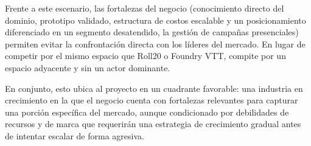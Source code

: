 Frente a este escenario, las fortalezas del negocio (conocimiento directo del dominio, prototipo validado, estructura de costos escalable y un posicionamiento diferenciado en un segmento desatendido, la gestión de campañas presenciales) permiten evitar la confrontación directa con los líderes del mercado. En lugar de competir por el mismo espacio que Roll20 o Foundry VTT, \nombreproyecto{} compite por un espacio adyacente y sin un actor dominante.

En conjunto, esto ubica al proyecto en un cuadrante favorable: una industria en crecimiento en la que el negocio cuenta con fortalezas relevantes para capturar una porción específica del mercado, aunque condicionado por debilidades de recursos y de marca que requerirán una estrategia de crecimiento gradual antes de intentar escalar de forma agresiva.
